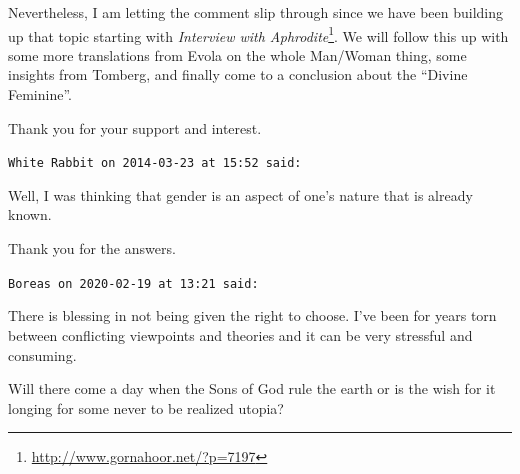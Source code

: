 \begin{footnotesize}
\begin{sffamily}
Nevertheless, I am letting the comment slip through since we have been building up that topic starting with \textit{Interview with Aphrodite}\footnote{\url{http://www.gornahoor.net/?p=7197}}. We will follow this up with some more translations from Evola on the whole Man/Woman thing, some insights from Tomberg, and finally come to a conclusion about the ``Divine Feminine''.

Thank you for your support and interest.

\hfill

\texttt{White Rabbit on 2014-03-23 at 15:52 said:}

Well, I was thinking that gender is an aspect of one's nature that is already known.

Thank you for the answers.

\hfill

\texttt{Boreas on 2020-02-19 at 13:21 said:}

There is blessing in not being given the right to choose. I've been for years torn between conflicting viewpoints and theories and it can be very stressful and consuming.

Will there come a day when the Sons of God rule the earth or is the wish for it longing for some never to be realized utopia?

\end{sffamily}
\end{footnotesize}


